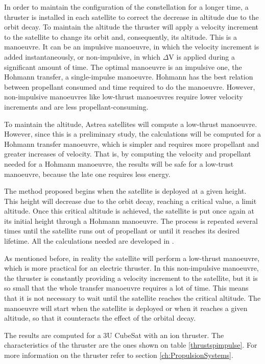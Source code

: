 In order to maintain the configuration of the constellation for a longer time, a thruster is installed in each satellite to correct the decrease in altitude due to the orbit decay. To maintain the altitude the thruster will apply a velocity increment to the satellite to change its orbit and, consequently, its altitude. This is a manoeuvre. It can be an impulsive manoeuvre, in which the velocity increment is added instantaneously, or non-impulsive, in which $\Delta$V is applied during a significant amount of time. The optimal manoeuvre is an impulsive one, the Hohmann transfer, a single-impulse manoeuvre. Hohmann has the best relation between propellant consumed and time required to do the manoeuvre. However, non-impulsive manoeuvres like low-thrust manoeuvres require lower velocity increments and are less propellant-consuming.

To maintain the altitude, Astrea satellites will compute a low-thrust manoeuvre. However, since this is a preliminary study, the calculations will be computed for a Hohmann transfer manoeuvre, which is simpler and requires more propellant and greater increases of velocity. That is, by computing the velocity and propellant needed for a Hohmann manoeuvre, the results will be safe for a low-trust manoeuvre, because the late one requires less energy.

The method proposed begins when the satellite is deployed at a given height. This height will decrease due to the orbit decay, reaching a critical value, a limit altitude. Once this critical altitude is achieved, the satellite is put once again at its initial height through a Hohmann manoeuvre. The process is repeated several times until the satellite runs out of propellant or until it reaches its desired lifetime. All the calculations needed are developed in \cite[Chapter 4, Section 3]{annex1}.

As mentioned before, in reality the satellite will perform a low-thrust manoeuvre, which is more practical for an electric thruster. In this non-impulsive manoeuvre, the thruster is constantly providing a velocity increment to the satellite, but it is so small that the whole transfer manoeuvre requires a lot of time. This means that it is not necessary to wait until the satellite reaches the critical altitude. The manoeuvre will start when the satellite is deployed or when it reaches a given altitude, so that it counteracts the effect of the orbital decay.

The results are computed for a 3U CubeSat with an ion thruster. The characteristics of the thruster are the ones shown on table \ref{thrustspimpulse}. For more information on the thruster refer to section \ref{ch:PropulsionSystems}.


